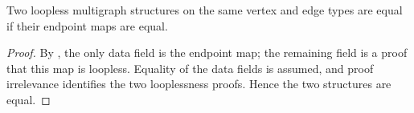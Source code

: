 \begin{lemma}
Two loopless multigraph structures on the same vertex and edge types are
equal if their endpoint maps are equal.
\end{lemma}
\begin{proof}
By , the only data field is the endpoint map; the
remaining field is a proof that this map is loopless.  Equality of the data
fields is assumed, and proof irrelevance identifies the two looplessness
proofs.  Hence the two structures are equal.
\end{proof}
